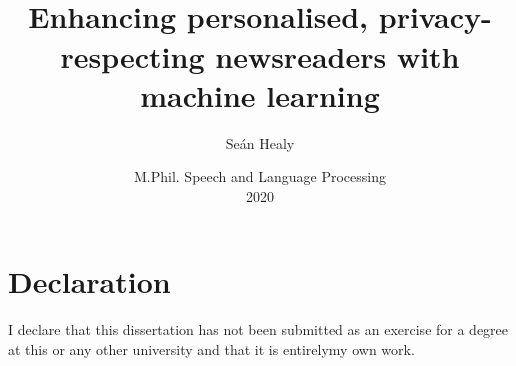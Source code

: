 \documentclass[12pt]{report}
\title{\nr{}
\\
Enhancing personalised, privacy-respecting newsreaders
with machine learning}
\author{Seán Healy}
\date{
    M.Phil. Speech and Language Processing\\
    2020
}
\begin{document}
\maketitle
\chapter*{Declaration}
I declare that this dissertation has not been submitted as an
exercise for a degree at this or any other university and that
it is entirelymy own work.
\thispagestyle{empty}



\linespread{1.2}
\tableofcontents
\doublespacing



\pagestyle{fancy}












\raggedright

\end{document}
